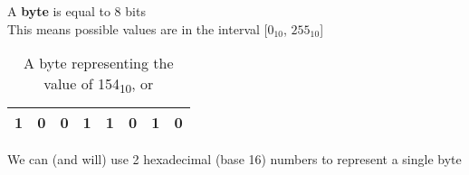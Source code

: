 \documentclass[../index.tex]{subfiles}
\begin{document}
\begin{frame}{\currenttitle}
%
%
  A \textbf{byte} is equal to 8 bits \\

  This means possible values are in the interval [$0_{10}$, $255_{10}$] \\

  \begin{table}
    \centering
    \begin{tabular}{c|c|c|c|c|c|c|c}
      \hline
      1 & 0 & 0 & 1 & 1 & 0 & 1 & 0 \\
      \hline
    \end{tabular}
    \caption{A byte representing the value of 154\textsubscript{10}, or }
  \end{table}

  We can (and will) use 2 hexadecimal (base 16) numbers to represent a single byte
\end{frame}
\end{document}
